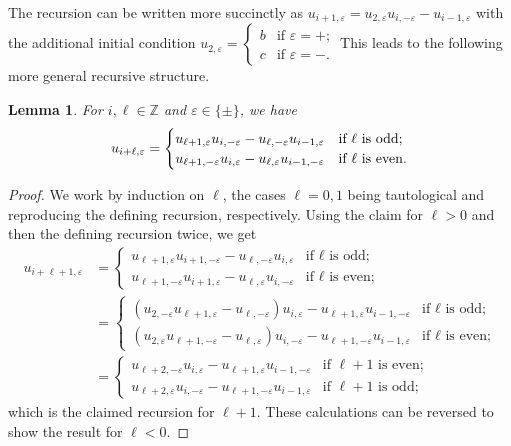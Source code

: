 \documentclass{amsart}
\newtheorem{lemma}[theorem]{Lemma}
\numberwithin{theorem}{section}
\newcommand{\ZZ}{\mathbb{Z}}
\begin{document}
  The recursion can be written more succinctly as $u_{i+1,\varepsilon}=u_{2,\varepsilon}u_{i,-\varepsilon}-u_{i-1,\varepsilon}$ with the additional initial condition $u_{2,\varepsilon}=\begin{cases} b & \text{if $\varepsilon=+$;}\\ c & \text{if $\varepsilon=-$.} \end{cases}$
  This leads to the following more general recursive structure.
  \begin{lemma}
    For $i,\ell\in\ZZ$ and $\varepsilon\in\{\pm\}$, we have
    \begin{equation}
      \label{eq:long Chebyshev recursion}
      u_{i+\ell,\varepsilon}=\begin{cases} u_{\ell+1,\varepsilon}u_{i,-\varepsilon}-u_{\ell,-\varepsilon}u_{i-1,\varepsilon} & \text{\upshape if $\ell$ is odd;}\\ u_{\ell+1,-\varepsilon}u_{i,\varepsilon}-u_{\ell,\varepsilon}u_{i-1,-\varepsilon} & \text{\upshape if $\ell$ is even.} \end{cases}
    \end{equation}
  \end{lemma}
  \begin{proof}
    We work by induction on $\ell$, the cases $\ell=0,1$ being tautological and reproducing the defining recursion, respectively.
    Using the claim for $\ell>0$ and then the defining recursion twice, we get
    \begin{align*}
      u_{i+\ell+1,\varepsilon}&=\begin{cases} u_{\ell+1,\varepsilon}u_{i+1,-\varepsilon}-u_{\ell,-\varepsilon}u_{i,\varepsilon} & \text{if $\ell$ is odd;}\\ u_{\ell+1,-\varepsilon}u_{i+1,\varepsilon}-u_{\ell,\varepsilon}u_{i,-\varepsilon} & \text{if $\ell$ is even;} \end{cases}\\
      &=\begin{cases} (u_{2,-\varepsilon}u_{\ell+1,\varepsilon}-u_{\ell,-\varepsilon})u_{i,\varepsilon}-u_{\ell+1,\varepsilon}u_{i-1,-\varepsilon} & \text{if $\ell$ is odd;}\\ (u_{2,\varepsilon}u_{\ell+1,-\varepsilon}-u_{\ell,\varepsilon})u_{i,-\varepsilon}-u_{\ell+1,-\varepsilon}u_{i-1,\varepsilon} & \text{if $\ell$ is even;} \end{cases}\\
      &=\begin{cases} u_{\ell+2,-\varepsilon}u_{i,\varepsilon}-u_{\ell+1,\varepsilon}u_{i-1,-\varepsilon} & \text{if $\ell+1$ is even;}\\ u_{\ell+2,\varepsilon}u_{i,-\varepsilon}-u_{\ell+1,-\varepsilon}u_{i-1,\varepsilon} & \text{if $\ell+1$ is odd;} \end{cases}
    \end{align*}
    which is the claimed recursion for $\ell+1$.
    These calculations can be reversed to show the result for $\ell<0$.
  \end{proof}
\end{document}
